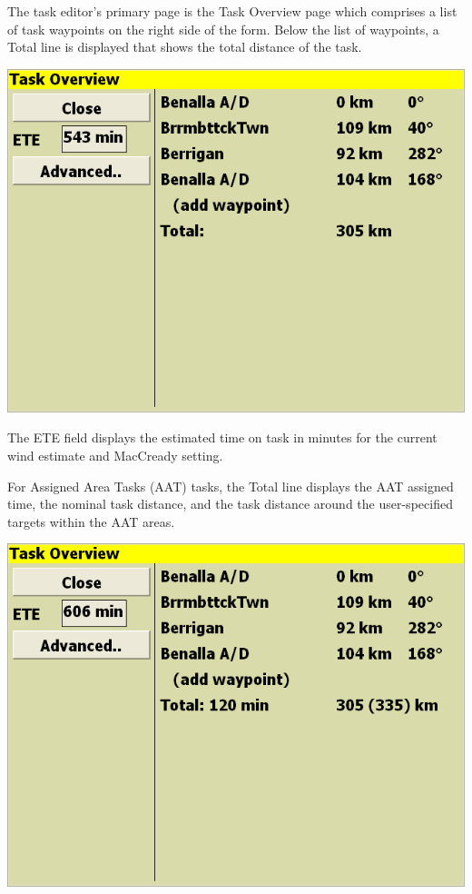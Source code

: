 \documentclass[a4paper,12pt]{refrep}
\begin{document}
The task editor's primary page is the Task Overview page which
comprises a list of task waypoints on the right side of the form.
Below the list of waypoints, a Total line is displayed that shows
the total distance of the task.
\begin{center}
\includegraphics[angle=0,width=\linewidth,keepaspectratio='true']{figures/dialog-taskedit0.png}
\end{center}
The ETE field displays the estimated time on task in minutes for the
current wind estimate and MacCready setting.

For Assigned Area Tasks (AAT) tasks, the Total line displays the AAT
assigned time, the nominal task distance, and the task distance around
the user-specified targets within the AAT areas.

\begin{center}
\includegraphics[angle=0,width=\linewidth,keepaspectratio='true']{figures/dialog-taskedit1.png}
\end{center}
\end{document}
